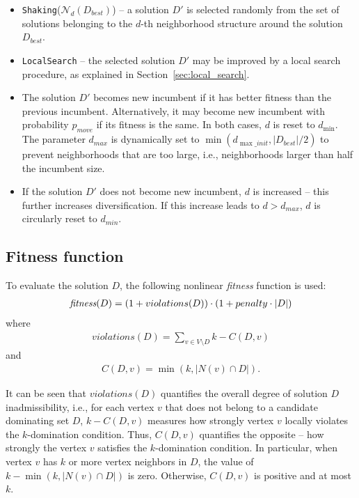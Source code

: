 \documentclass[dvipsnames,format=sigconf,anonymous=true,review=true]{acmart}
\begin{document}
  \begin{itemize}
  	\item \texttt{Shaking}($\mathcal{N}_d(D_{best})$) -- a solution $D'$ is selected   randomly from the set of solutions belonging to the $d$-th neighborhood structure around the solution $D_{best}$.
  	\item  \texttt{LocalSearch} -- the selected solution $D'$ may be improved by a local search procedure, as explained in Section~\ref{sec:local_search}.
  	\item The solution $D'$ becomes new incumbent if it has better fitness than the previous incumbent. Alternatively, it may become new incumbent with probability $p_{move}$ if its fitness is the same. In both cases, $d$ is reset to $d_{\min}$. The parameter $d_{max}$ is dynamically set to $\min(d_{\max\_init}, |D_{best}|/2)$ to prevent neighborhoods that are too large, i.e., neighborhoods larger than half  the incumbent size. 
  	\item  If the solution $D'$ does not become new incumbent, $d$ is increased -- this further increases diversification. If this increase leads to $d> d_{max}$, $d$ is circularly reset to $d_{min}$.
   \end{itemize}
    
\subsection{Fitness function}\label{subsec:fit}
   To evaluate the solution $D$, the following nonlinear \emph{fitness} function is used:
   \begin{align}\label{eq:fitness}
      \emph{fitness}(D) = ( 1 + violations(D)) \cdot ( 1+ penalty \cdot |D|)
   \end{align}
   where 
   \begin{align}
   	   violations(D) = \sum_{v \in V \setminus D}{k-C(D, v)}
   \end{align}
   and 
   \begin{align}
   	 C(D, v) = \min(k, |N(v) \cap D|).
   \end{align}

It can be seen that $violations(D)$ quantifies the overall degree of solution $D$ inadmissibility, i.e., for each vertex $v$ that does not belong to a candidate dominating set $D$, $k-C(D, v)$ measures how strongly vertex $v$ locally violates the $k$-domination condition. Thus, $C(D, v)$ quantifies the opposite -- how strongly the vertex $v$ satisfies the $k$-domination condition. In particular, when vertex $v$ has $k$ or more vertex neighbors in $D$, the value of $k - \min(k, |N(v) \cap D|)$ is zero. Otherwise, $C(D, v)$ is positive and at most $k$. 
\end{document}
